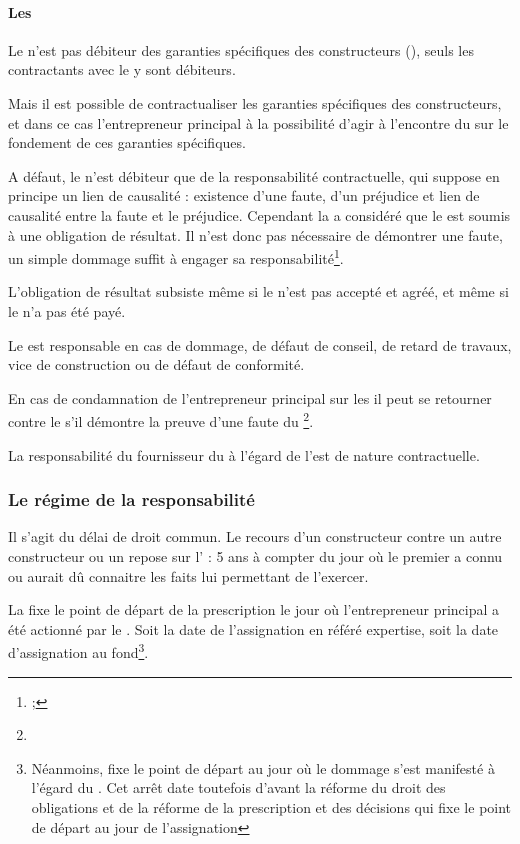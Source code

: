 			\paragraph{Les \garSpec} Le \ST n’est pas débiteur des garanties spécifiques des constructeurs (\lesGarSpec), seuls les contractants avec le \MO y sont débiteurs.


			Mais il est possible de contractualiser les garanties spécifiques des constructeurs, et dans ce cas l’entrepreneur principal à la possibilité d'agir à l’encontre du \ST sur le fondement de ces garanties spécifiques.


			A défaut, le \ST n’est débiteur que de la responsabilité contractuelle, qui suppose en principe un lien de causalité : existence d’une faute, d'un préjudice et lien de causalité entre la faute et le préjudice.
Cependant la \JP a considéré que le \ST est soumis à une obligation de résultat. Il n'est donc pas nécessaire de démontrer une faute, un simple dommage suffit à engager sa responsabilité\footnote{ ; }.

			L'obligation de résultat subsiste même si le \ST n'est pas accepté et agréé, et même si le \ST n’a pas été payé.

			\medbreak Le \ST est responsable en cas de dommage, de défaut de conseil, de retard de travaux, vice de construction ou de défaut de conformité.

			En cas de condamnation de l’entrepreneur principal sur les \TAV il peut se retourner contre le \ST s’il démontre la preuve d’une faute du \ST\footnote{}. %

			La responsabilité du fournisseur du \ST à l’égard de l’\ep est de nature contractuelle.



		\subsubsection{Le régime de la responsabilité}

			Il s'agit du délai de droit commun. Le recours d’un constructeur contre un autre constructeur ou un \ST
repose sur l' : 5 ans à compter du jour où le premier a connu ou aurait dû connaitre les faits lui permettant de l’exercer.

			La \CourDeCas fixe le point de départ de la prescription le jour où l’entrepreneur principal a été actionné par le \MO. Soit la date de l’assignation en référé expertise, soit la date d’assignation au fond\footnote{Néanmoins,  fixe le point de départ au jour où le dommage s’est manifesté à l’égard du \MO. Cet arrêt date toutefois d'avant la réforme du droit des obligations et de la réforme de la prescription et des décisions qui fixe le point de départ au jour de l’assignation}.


